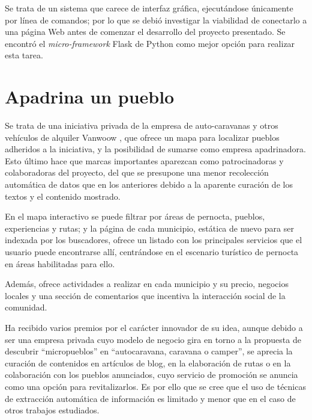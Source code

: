 Se trata de un sistema que carece de interfaz gráfica, ejecutándose únicamente por línea de comandos; por lo que se debió investigar la viabilidad de conectarlo a una página Web antes de comenzar el desarrollo del proyecto presentado. Se encontró el \textit{micro-framework} Flask de Python como mejor opción para realizar esta tarea.

\section{Apadrina un pueblo}


Se trata de una iniciativa privada de la empresa de auto-caravanas y otros vehículos de alquiler Vanwoow \cite{apadrina_un_pueblo}, que ofrece un mapa para localizar pueblos adheridos a la iniciativa, y la posibilidad de sumarse como empresa apadrinadora. Esto último hace que marcas importantes aparezcan como patrocinadoras y colaboradoras del proyecto, del que se presupone una menor recolección automática de datos que en los anteriores debido a la aparente curación de los textos y el contenido mostrado.


En el mapa interactivo se puede filtrar por áreas de pernocta, pueblos, experiencias y rutas; y la página de cada municipio, estática de nuevo para ser indexada por los buscadores, ofrece un listado con los principales servicios que el usuario puede encontrarse allí, centrándose en el escenario turístico de pernocta en áreas habilitadas para ello.


Además, ofrece actividades a realizar en cada municipio y su precio, negocios locales y una sección de comentarios que incentiva la interacción social de la comunidad.


Ha recibido varios premios por el carácter innovador de su idea, aunque debido a ser una empresa privada cuyo modelo de negocio gira en torno a la propuesta de descubrir ``micropueblos'' en ``autocaravana, caravana o camper'', se aprecia la curación de contenidos en artículos de blog, en la elaboración de rutas o en la colaboración con los pueblos anunciados, cuyo servicio de promoción se anuncia como una opción para revitalizarlos. Es por ello que se cree que el uso de técnicas de extracción automática de información es limitado y menor que en el caso de otros trabajos estudiados.

